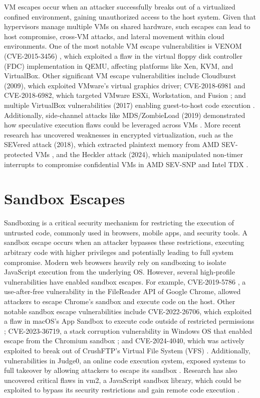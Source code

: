 \documentclass[12pt]{report}
\begin{document}
\begin{doublespace}
VM escapes occur when an attacker successfully breaks out of a virtualized confined environment, gaining unauthorized access to the host system. Given that hypervisors manage multiple VMs on shared hardware, such escapes can lead to host compromise, cross-VM attacks, and lateral movement within cloud environments. One of the most notable VM escape vulnerabilities is VENOM (CVE-2015-3456) \cite{abdoul2018novel}, which exploited a flaw in the virtual floppy disk controller (FDC) implementation in QEMU, affecting platforms like Xen, KVM, and VirtualBox. Other significant VM escape vulnerabilities include Cloudburst (2009), which exploited VMware's virtual graphics driver; CVE-2018-6981 and CVE-2018-6982, which targeted VMware ESXi, Workstation, and Fusion \cite{vmware2018escape}; and multiple VirtualBox vulnerabilities (2017) enabling guest-to-host code execution \cite{virtualbox2017bugs}. Additionally, side-channel attacks like MDS/ZombieLoad (2019) demonstrated how speculative execution flaws could be leveraged across VMs \cite{mds2019attack}. More recent research has uncovered weaknesses in encrypted virtualization, such as the SEVered attack (2018), which extracted plaintext memory from AMD SEV-protected VMs \cite{severed2018}, and the Heckler attack (2024), which manipulated non-timer interrupts to compromise confidential VMs in AMD SEV-SNP and Intel TDX \cite{heckler2024}.\\

\section{Sandbox Escapes} 

Sandboxing is a critical security mechanism for restricting the execution of untrusted code, commonly used in browsers, mobile apps, and security tools. A sandbox escape occurs when an attacker bypasses these restrictions, executing arbitrary code with higher privileges and potentially leading to full system compromise. Modern web browsers heavily rely on sandboxing to isolate JavaScript execution from the underlying OS. However, several high-profile vulnerabilities have enabled sandbox escapes. For example, CVE-2019-5786 \cite{chromezeroday}, a use-after-free vulnerability in the FileReader API of Google Chrome, allowed attackers to escape Chrome's sandbox and execute code on the host. Other notable sandbox escape vulnerabilities include CVE-2022-26706, which exploited a flaw in macOS's App Sandbox to execute code outside of restricted permissions \cite{macossandboxescape}; CVE-2023-36719, a stack corruption vulnerability in Windows OS that enabled escape from the Chromium sandbox \cite{chromiumsandboxescape}; and CVE-2024-4040, which was actively exploited to break out of CrushFTP’s Virtual File System (VFS) \cite{crushftpsandboxescape}. Additionally, vulnerabilities in Judge0, an online code execution system, exposed systems to full takeover by allowing attackers to escape its sandbox \cite{judge0sandboxescape}. Research has also uncovered critical flaws in vm2, a JavaScript sandbox library, which could be exploited to bypass its security restrictions and gain remote code execution \cite{vm2sandboxescape}.


\end{doublespace}
\end{document}

